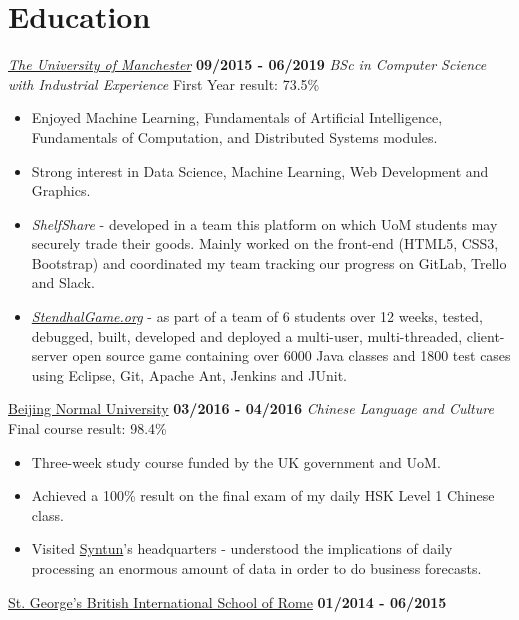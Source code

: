 \documentclass[]{friggeri-cv}
\begin{document}
\section{\color{red}Edu\color{gray}cation}
\begin{entrylist}
  \entry
    {}
    {\emph{\href{http://www.manchester.ac.uk/}{The University of Manchester}}}
    {\textbf{09/2015 - 06/2019}}
    {\emph{BSc in Computer Science with Industrial Experience}}
    {First Year result: 73.5\%}
    \begin{itemize}
        \item Enjoyed Machine Learning, Fundamentals of Artificial Intelligence, Fundamentals of Computation, and Distributed Systems modules.
        \item Strong interest in Data Science, Machine Learning, Web Development and Graphics.
        \item \emph{ShelfShare} - developed in a team this platform on which UoM students may securely trade their goods. Mainly worked on the front-end (HTML5, CSS3, Bootstrap) and coordinated my team tracking our progress on GitLab, Trello and Slack.
        \item \emph{\href{https://stendhalgame.org/}{StendhalGame.org}} - as part of a team of 6 students over 12 weeks, tested, debugged, built, developed and deployed a multi-user, multi-threaded, client-server open source game containing over 6000 Java classes and 1800 test cases using Eclipse, Git, Apache Ant, Jenkins and JUnit.\\
    \end{itemize}
  \entry
    {}
    {\href{http://english.bnu.edu.cn/}{Beijing Normal University}}
    {\textbf{03/2016 - 04/2016}}
    {\emph{Chinese Language and Culture}}
    {Final course result: 98.4\%}
    \begin{itemize}
        \item Three-week study course funded by the UK government and UoM.
        \item Achieved a 100\% result on the final exam of my daily HSK Level 1 Chinese class.
        \item Visited \href{http://www.syntun.com/}{Syntun}'s headquarters - understood the implications of daily processing an enormous amount of data in order to do business forecasts.\\
    \end{itemize}
  \entry
    {}
    {\href{http://www.stgeorge.school.it/}{St. George's British International School of Rome}}
    {\textbf{01/2014 - 06/2015}}

\end{entrylist}
\end{document}
